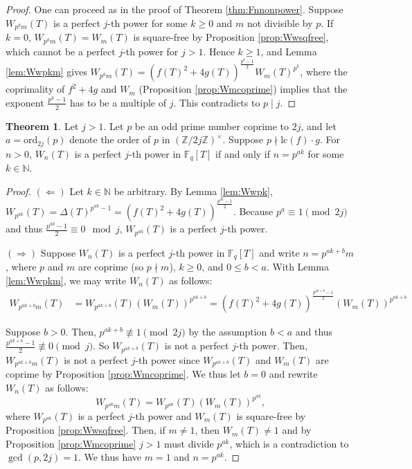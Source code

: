 \documentclass[letterpaper, 10pt]{article}
\newcommand{\lc}{\mathrm{lc}}
\newcommand{\1}{\mathds{1}}	%
\theoremstyle{definition}
\newtheorem{theorem}{Theorem}[section]
\theoremstyle{remark}
\begin{document}
\begin{proof}
    One can proceed as in the proof of Theorem \ref{thm:Fnnonpower}.
    Suppose $W_{p^km} (T)$ is a perfect $j$-th power for some $k \ge 0$ and $m$ not divisible by $p$.
    If $k = 0$, $W_{p^k m}(T) = W_{m}(T)$ is square-free by Proposition \ref{prop:Wwsqfree}, which cannot be a perfect $j$-th power for $j > 1$.
    Hence $k \ge 1$, and Lemma \ref{lem:Wwpkm} gives $W_{p^k m}(T) = (f(T)^2 + 4g(T))^{\frac{p^k - 1}{2}} W_m(T)^{p^k}$, where the coprimality of $f^2 + 4g$ and $W_m$ (Proposition \ref{prop:Wmcoprime}) implies that the exponent $\frac{p^k - 1}{2}$ has to be a multiple of $j$.
    This contradicts to $p \mid j$.
\end{proof}

\begin{theorem}
    \label{thm:Wn_perfect_power}
    Let $j > 1$. Let $p$ be an odd prime number coprime to $2j$, and let $a = \mathrm{ord}_{2j}(p)$ denote the order of $p$ in $\left( \mathbb{Z}/2j\mathbb{Z} \right)^\times$. Suppose $p \nmid \lc(f) \cdot g$. For $n > 0$, $W_n(T)$ is a perfect $j$-th power in $\mathbb{F}_q[T]$ if and only if $n = p^{ak}$ for some $k \in \mathbb{N}$.
\end{theorem}

\begin{proof}
    $(\Leftarrow)$ Let $k \in \mathbb{N}$ be arbitrary. By Lemma \ref{lem:Wwpk}, $W_{p^{ak}}(T) = \Delta(T)^{p^{ak} - 1} = \left(f(T)^2 + 4 g(T) \right)^{\frac{p^{ak} - 1}{2}}$. Because $p^a \equiv 1 \pmod{2j}$ and thus $\frac{p^{ak} - 1}{2} \equiv 0 \mod j$, $W_{p^{ak}}(T)$ is a perfect $j$-th power.
    
    $(\Rightarrow)$ Suppose $W_n(T)$ is a perfect $j$-th power in $\mathbb{F}_q[T]$ and write $n = p^{ak + b}m$, where $p$ and $m$ are coprime (so $p \nmid m$), $k \geq 0$, and \(0 \le b < a\). With Lemma \ref{lem:Wwpkm}, we may write $W_n(T)$ as follows:
    \begin{align*}
        W_{p^{ak + b}m}(T) &= W_{p^{ak + b}}(T) \left(W_m(T)\right)^{p^{ak + b}} = \left(f(T)^2 + 4 g(T) \right)^{\frac{p^{ak +b} - 1}{2}} \left(W_m(T)\right)^{p^{ak + b}}
    \end{align*}

    Suppose $b > 0$. Then, $p^{ak + b} \not \equiv 1 \pmod{2j}$ by the assumption $b < a$ and thus $\frac{p^{ak + b} - 1}{2} \not \equiv 0 \pmod j$. So $W_{p^{ak + b}}(T)$ is not a perfect $j$-th power. Then, $W_{p^{ak + b}m}(T)$ is not a perfect $j$-th power since $W_{p^{ak + b}}(T)$ and $W_m(T)$ are coprime by Proposition \ref{prop:Wmcoprime}. We thus let $b = 0$ and rewrite $W_n(T)$ as follows: $$W_{p^{ak}m}(T) = W_{p^{ak}}(T) \left(W_m(T)\right)^{p^{ak}} \text{,}$$ where $W_{p^{ak}}(T)$ is a perfect $j$-th power and $W_m(T)$ is square-free by Proposition \ref{prop:Wwsqfree}. Then, if $m \neq 1$, then $W_m(T) \neq 1$ and by Proposition \ref{prop:Wmcoprime} $j > 1$ must divide $p^{ak}$, which is a contradiction to $\gcd(p,2j) = 1$. We thus have $m = 1$ and $n = p^{ak}$.
\end{proof}
\end{document}

